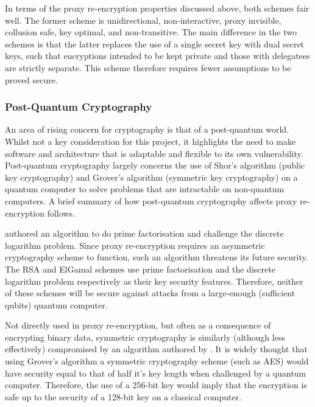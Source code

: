 In terms of the proxy re-encryption properties discussed above, both schemes fair well. The former scheme is unidirectional, non-interactive, proxy invisible, collusion safe, key optimal, and non-transitive. The main difference in the two schemes is that the latter replaces the use of a single secret key with dual secret keys, such that encryptions intended to be kept private and those with delegatees are strictly separate. This scheme therefore requires fewer assumptions to be proved secure.



\subsubsection{Post-Quantum Cryptography}

An area of rising concern for cryptography is that of a post-quantum world. Whilst not a key consideration for this project, it highlights the need to make software and architecture that is adaptable and flexible to its own vulnerability. Post-quantum cryptography largely concerns the use of Shor's algorithm (public key cryptography) and Grover's algorithm (symmetric key cryptography) on a quantum computer to solve problems that are intractable on non-quantum computers. A brief summary of how post-quantum cryptography affects proxy re-encryption follows.

\cite{shor:1999:article} authored an algorithm to do prime factorisation and challenge the discrete logarithm problem. Since proxy re-encryption requires an asymmetric cryptography scheme to function, such an algorithm threatens its future security. The RSA and ElGamal schemes use prime factorisation and the discrete logarithm problem respectively as their key security features. Therefore, neither of these schemes will be secure against attacks from a large-enough (sufficient qubits) quantum computer.

Not directly used in proxy re-encryption, but often as a consequence of encrypting binary data, symmetric cryptography is similarly (although less effectively) compromised by an algorithm authored by \cite{grover:1996:inproceedings}. It is widely thought that using Grover's algorithm a symmetric cryptography scheme (such as AES) would have security equal to that of half it's key length when challenged by a quantum computer. Therefore, the use of a 256-bit key would imply that the encryption is safe up to the security of a 128-bit key on a classical computer.
